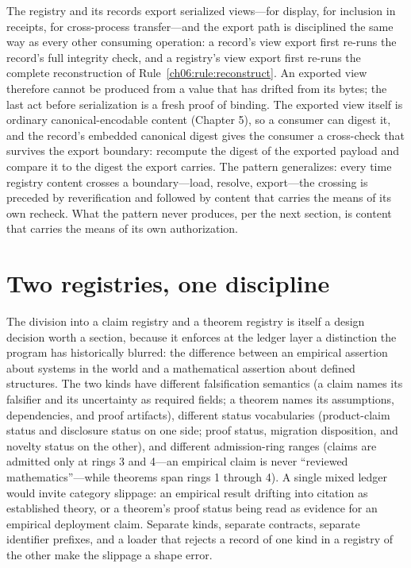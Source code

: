 The registry and its records export serialized views---for display, for
inclusion in receipts, for cross-process transfer---and the export path
is disciplined the same way as every other consuming operation: a
record's view export first re-runs the record's full integrity check,
and a registry's view export first re-runs the complete reconstruction
of Rule~\ref{ch06:rule:reconstruct}. An exported view therefore cannot
be produced from a value that has drifted from its bytes; the last act
before serialization is a fresh proof of binding. The exported view
itself is ordinary canonical-encodable content (Chapter 5), so a
consumer can digest it, and the record's embedded canonical digest
gives the consumer a cross-check that survives the export boundary:
recompute the digest of the exported payload and compare it to the
digest the export carries. The pattern generalizes: every time registry
content crosses a boundary---load, resolve, export---the crossing is
preceded by reverification and followed by content that carries the
means of its own recheck. What the pattern never produces, per the next
section, is content that carries the means of its own authorization.

\section{Two registries, one discipline}\label{ch06:tworegistries}

The division into a claim registry and a theorem registry is itself a
design decision worth a section, because it enforces at the ledger
layer a distinction the program has historically blurred: the
difference between an empirical assertion about systems in the world
and a mathematical assertion about defined structures. The two kinds
have different falsification semantics (a claim names its falsifier
and its uncertainty as required fields; a theorem names its
assumptions, dependencies, and proof artifacts), different status
vocabularies (product-claim status and disclosure status on one side;
proof status, migration disposition, and novelty status on the other),
and different admission-ring ranges (claims are admitted only at rings
3 and 4---an empirical claim is never ``reviewed mathematics''---while
theorems span rings 1 through 4). A single mixed ledger would invite
category slippage: an empirical result drifting into citation as
established theory, or a theorem's proof status being read as evidence
for an empirical deployment claim. Separate kinds, separate contracts,
separate identifier prefixes, and a loader that rejects a record of
one kind in a registry of the other make the slippage a shape error.

